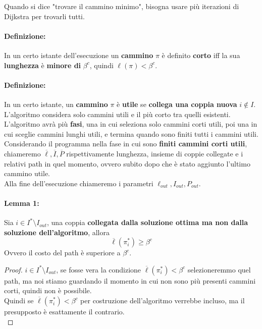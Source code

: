 \newpage

Quando si dice "trovare il cammino minimo", bisogna usare più iterazioni di Dijkstra per trovarli tutti.\\

\paragraph{Definizione:} In un certo istante dell'esecuzione un \textbf{cammino} $\pi$ è definito \textbf{corto} iff la sua \textbf{lunghezza} è \textbf{minore di} $\beta^c$, quindi $\ell(\pi) < \beta^c$. \\

\paragraph{Definizione:} In un certo istante, un \textbf{cammino} $\pi$ è \textbf{utile} se \textbf{collega una coppia nuova} $i \notin I$. L'algoritmo considera solo cammini utili e il più corto tra quelli esistenti.\\

L'algoritmo avrà più \textbf{fasi}, una in cui seleziona solo cammini corti utili, poi una in cui sceglie cammini lunghi utili, e termina quando sono finiti tutti i cammini utili.\\

Considerando il programma nella fase in cui sono \textbf{finiti cammini corti utili}, chiameremo $\overline{\ell}, \overline{I}, \overline{P}$ rispettivamente lunghezza, insieme di coppie collegate e i relativi path in quel momento, ovvero subito dopo che è stato aggiunto l'ultimo cammino utile.\\
Alla fine dell'esecuzione chiameremo i parametri $\ell_{out}, I_{out}, P_{out}$.\\

\paragraph{Lemma 1:} Sia $i \in I^\ast \setminus I_{out}$, una coppia \textbf{collegata dalla soluzione ottima ma non dalla soluzione dell'algoritmo}, allora 
$$\overline{\ell} (\pi_i^\ast) \geq \beta^c$$
Ovvero il costo del path è superiore a $\beta^c$. \\

\begin{proof}
	$i \in I^\ast \setminus I_{out}$, se fosse vera la condizione $\overline{\ell} (\pi_i^\ast) < \beta^c$ selezioneremmo quel path, ma noi stiamo guardando il momento in cui non sono più presenti cammini corti, quindi non è possibile.\\
	Quindi se $\overline{\ell} (\pi_i^\ast) < \beta^c$ per costruzione dell'algoritmo verrebbe incluso, ma il presupposto è esattamente il contrario.\\
\end{proof}

